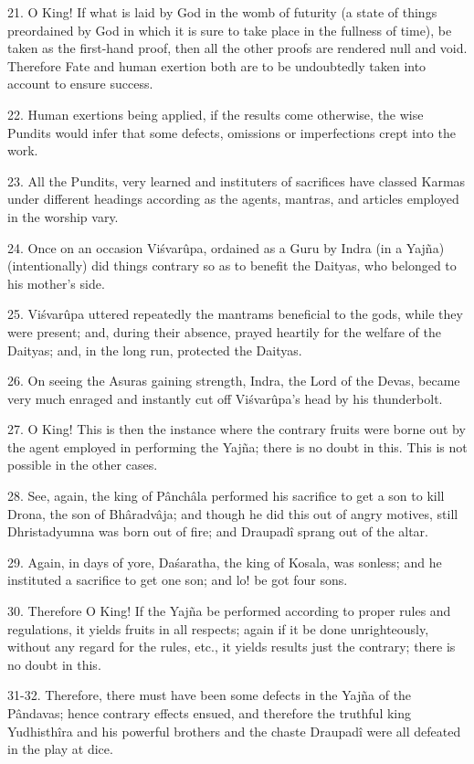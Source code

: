 21. O King! If what is laid by God in the womb of futurity (a state of things preordained by God in which it is sure to take place in the fullness of time), be taken as the first-hand proof, then all the other proofs are rendered null and void. Therefore Fate and human exertion both are to be undoubtedly taken into account to ensure success.

22. Human exertions being applied, if the results come otherwise, the wise Pundits would infer that some defects, omissions or imperfections crept into the work.

23. All the Pundits, very learned and instituters of sacrifices have classed Karmas under different headings according as the agents, mantras, and articles employed in the worship vary.

24. Once on an occasion Vi\'svarûpa, ordained as a Guru by Indra (in a Yaj\~na) (intentionally) did things contrary so as to benefit the Daityas, who belonged to his mother's side.

25. Vi\'svarûpa uttered repeatedly the mantrams beneficial to the gods, while they were present; and, during their absence, prayed heartily for the welfare of the Daityas; and, in the long run, protected the Daityas.

26. On seeing the Asuras gaining strength, Indra, the Lord of the Devas, became very much enraged and instantly cut off Vi\'svarûpa's head by his thunderbolt.

27. O King! This is then the instance where the contrary fruits were borne out by the agent employed in performing the Yaj\~na; there is no doubt in this. This is not possible in the other cases.

28. See, again, the king of P\^anch\^ala performed his sacrifice to get a son to kill Drona, the son of Bh\^aradv\^aja; and though he did this out of angry motives, still Dhristadyumna was born out of fire; and Draupad\^i sprang out of the altar.

29. Again, in days of yore, Da\'saratha, the king of Kosala, was sonless; and he instituted a sacrifice to get one son; and lo! be got four sons.

30. Therefore O King! If the Yaj\~na be performed according to proper rules and regulations, it yields fruits in all respects; again if it be done unrighteously, without any regard for the rules, etc., it yields results just the contrary; there is no doubt in this.

31-32. Therefore, there must have been some defects in the Yaj\~na of the P\^andavas; hence contrary effects ensued, and therefore the truthful king Yudhisth\^ira and his powerful brothers and the chaste Draupad\^i were all defeated in the play at dice.

